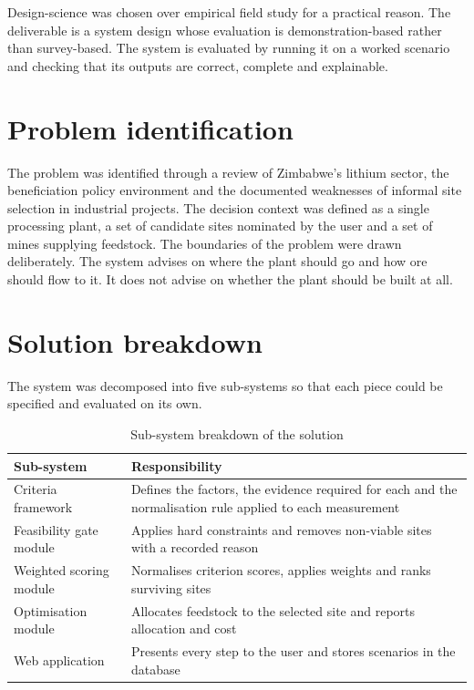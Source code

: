 \documentclass[12pt,a4paper]{report}
\begin{document}
Design-science was chosen over empirical field study for a practical
reason. The deliverable is a system design whose evaluation is
demonstration-based rather than survey-based. The system is evaluated
by running it on a worked scenario and checking that its outputs are
correct, complete and explainable.

\section{Problem identification}
The problem was identified through a review of Zimbabwe's lithium
sector, the beneficiation policy environment and the documented
weaknesses of informal site selection in industrial projects. The
decision context was defined as a single processing plant, a set of
candidate sites nominated by the user and a set of mines supplying
feedstock. The boundaries of the problem were drawn deliberately. The
system advises on where the plant should go and how ore should flow to
it. It does not advise on whether the plant should be built at all.

\section{Solution breakdown}
The system was decomposed into five sub-systems so that each piece
could be specified and evaluated on its own.

\begin{table}[h]
\centering
\caption{Sub-system breakdown of the solution}
\begin{tabular}{p{4.2cm}p{9.2cm}}
\toprule
Sub-system & Responsibility \\
\midrule
Criteria framework & Defines the factors, the evidence required for
each and the normalisation rule applied to each measurement \\
Feasibility gate module & Applies hard constraints and removes
non-viable sites with a recorded reason \\
Weighted scoring module & Normalises criterion scores, applies weights
and ranks surviving sites \\
Optimisation module & Allocates feedstock to the selected site and
reports allocation and cost \\
Web application & Presents every step to the user and stores scenarios
in the database \\
\bottomrule
\end{tabular}
\end{table}
\end{document}
